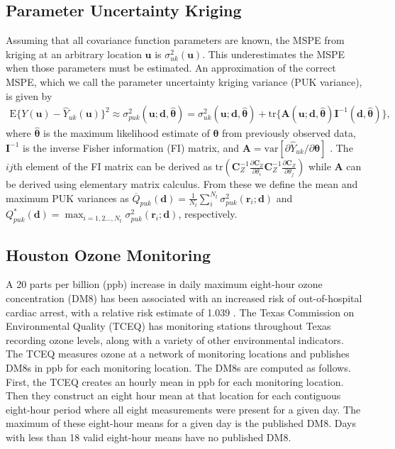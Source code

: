 \documentclass[cmbright]{staauth}
\newcommand{\var}{\mathrm{var}}
\newcommand{\E}{\mathrm{E}}
\newcommand{\tr}{\mathrm{tr}}
\begin{document}
\subsection{Parameter Uncertainty Kriging}
Assuming that all covariance function parameters are known, the MSPE from kriging at an arbitrary location $\bm{u}$ is $\sigma_{uk}^2(\bm{u})$. This underestimates the MSPE when those parameters must be estimated. An approximation of the correct MSPE, which we call the parameter uncertainty kriging variance (PUK variance), is given by
\begin{align*}
\E\{Y(\bm{u}) - \widehat{Y}_{uk}(\bm{u})\}^2 \approx \sigma^2_{puk}(\bm{u};\bm{d},\widehat{\bm{\theta}}) = \sigma^2_{uk}(\bm{u};\bm{d},\widehat{\bm{\theta}}) + \tr\{\bm{A}(\bm{u};\bm{d},\widehat{\bm{\theta}})\bm{I}^{-1}(\bm{d},\widehat{\bm{\theta}})\},
\end{align*}
where $\widehat{\bm{\theta}}$ is the maximum likelihood estimate of $\bm{\theta}$ from previously observed data, $\bm{I}^{-1}$ is the inverse Fisher information (FI) matrix, and $\bm{A} = \var[\partial \widehat{Y}_{uk} /\partial \bm{\theta}]$ \citep{zimmerman1992mean,abt1999estimating}. The $ij$th element of the FI matrix can be derived as $\tr\left(\bm{C}_Z^{-1}\frac{\partial\bm{C}_Z}{\partial\theta_i}\bm{C}_Z^{-1}\frac{\partial\bm{C}_Z}{\partial\theta_j}\right)$ while $\bm{A}$ can be derived using elementary matrix calculus. From these we define the mean and maximum  PUK variances as $\overline{Q}_{puk}(\bm{d}) = \frac{1}{N_t}\sum_{i}^{N_t}\sigma^2_{puk}(\bm{r}_i;\bm{d})$ and $Q_{puk}^*(\bm{d}) = \max_{i=1,2\dots,N_t}\sigma^2_{puk}(\bm{r}_i;\bm{d})$, respectively.

\subsection{Houston Ozone Monitoring}\label{sec:houston}
A 20 parts per billion (ppb) increase in daily maximum eight-hour ozone concentration (DM8) has been associated with an increased risk of out-of-hospital cardiac arrest, with a relative risk estimate of 1.039 \cite[95\% CI {[}1.005, 1.073{]};][]{ensor2013case}. The Texas Commission on Environmental Quality (TCEQ) has monitoring stations throughout Texas recording ozone levels, along with a variety of other environmental indicators. The TCEQ measures ozone at a network of monitoring locations and publishes DM8s in ppb for each monitoring location. The DM8s are computed as follows. First, the TCEQ creates an hourly mean in ppb for each monitoring location. Then they construct an eight hour mean at that location for each contiguous eight-hour period where all eight measurements were present for a given day. The maximum of these eight-hour means for a given day is the published DM8. Days with less than 18 valid eight-hour means have no published DM8.
\end{document}
